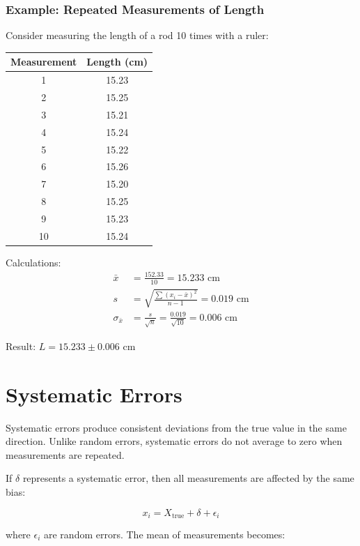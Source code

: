 \documentclass[twoside]{book}
\begin{document}
\subsubsection{Example: Repeated Measurements of Length}

Consider measuring the length of a rod 10 times with a ruler:

\begin{center}
\begin{tabular}{c|c}
\toprule
Measurement & Length (cm) \\
\midrule
1 & 15.23 \\
2 & 15.25 \\
3 & 15.21 \\
4 & 15.24 \\
5 & 15.22 \\
6 & 15.26 \\
7 & 15.20 \\
8 & 15.25 \\
9 & 15.23 \\
10 & 15.24 \\
\bottomrule
\end{tabular}
\end{center}

Calculations:
\begin{align*}
\bar{x} &= \frac{152.33}{10} = 15.233 \text{ cm} \\
s &= \sqrt{\frac{\sum(x_i - \bar{x})^2}{n-1}} = 0.019 \text{ cm} \\
\sigma_{\bar{x}} &= \frac{s}{\sqrt{n}} = \frac{0.019}{\sqrt{10}} = 0.006 \text{ cm}
\end{align*}

Result: $L = 15.233 \pm 0.006$ cm

\section{Systematic Errors}

Systematic errors produce consistent deviations from the true value in the same direction. Unlike random errors, systematic errors do not average to zero when measurements are repeated.

If $\delta$ represents a systematic error, then all measurements are affected by the same bias:

\begin{equation*}
x_i = X_{\text{true}} + \delta + \epsilon_i
\end{equation*}

where $\epsilon_i$ are random errors. The mean of measurements becomes:
\end{document}
